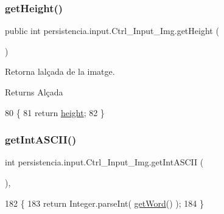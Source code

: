 \subsubsection{\texorpdfstring{get\+Height()}{getHeight()}}
{\footnotesize\ttfamily public int persistencia.\+input.\+Ctrl\+\_\+\+Input\+\_\+\+Img.\+get\+Height (\begin{DoxyParamCaption}{ }\end{DoxyParamCaption})\hspace{0.3cm}{\ttfamily [inline]}}



Retorna l\textquotesingle{}alçada de la imatge. 

\begin{DoxyReturn}{Returns}
Alçada 
\end{DoxyReturn}

\begin{DoxyCode}
80                            \{
81         \textcolor{keywordflow}{return} \hyperlink{classpersistencia_1_1input_1_1Ctrl__Input__Img_abc1dcc48714e9e74fb8ae0e0b81f91bf}{height};
82     \}
\end{DoxyCode}
\mbox{\label{classpersistencia_1_1input_1_1Ctrl__Input__Img_a430158ff229038ddc3476d406239f4cd}} 
\subsubsection{\texorpdfstring{get\+Int\+A\+S\+C\+I\+I()}{getIntASCII()}}
{\footnotesize\ttfamily int persistencia.\+input.\+Ctrl\+\_\+\+Input\+\_\+\+Img.\+get\+Int\+A\+S\+C\+II (\begin{DoxyParamCaption}{ }\end{DoxyParamCaption})\hspace{0.3cm}{\ttfamily [inline]}, {\ttfamily [private]}}


\begin{DoxyCode}
182                               \{
183         \textcolor{keywordflow}{return} Integer.parseInt( \hyperlink{classpersistencia_1_1input_1_1Ctrl__Input__Img_a17676e8616da5821ca2323da4691d240}{getWord}() );
184     \}
\end{DoxyCode}
\mbox{\label{classpersistencia_1_1input_1_1Ctrl__Input__Img_a53ec1b76b3fe590640ba6ed08adc2de2}} 
